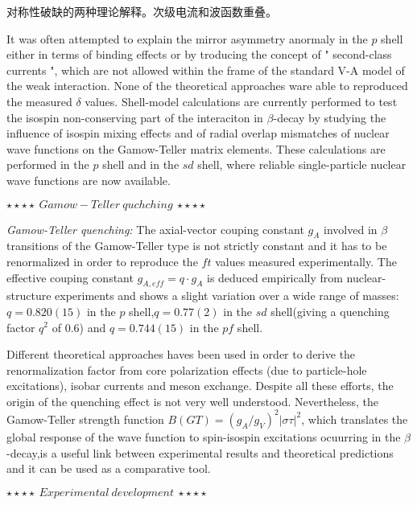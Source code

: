 \documentclass[UTF8]{ctexart}
\begin{document}
对称性破缺的两种理论解释。次级电流和波函数重叠。

It was often attempted to explain the mirror asymmetry anormaly in the $p$ shell either in terms of binding effects or by troducing the concept of " second-class currents ", which are not allowed within the frame of the standard V-A model of the weak interaction. None of the theoretical approaches ware able to reproduced the measured $\delta$ values. Shell-model calculations are currently performed to test the isospin non-conserving part of the interaciton in $\beta$-decay by studying the influence of isospin mixing effects and of radial overlap mismatches of nuclear wave functions on the Gamow-Teller matrix elements. These calculations are performed in the $p$ shell and in the $sd$ shell, where reliable single-particle nuclear wave functions are now available.


$\star\star\star\star~Gamow-Teller~quchching~\star\star\star\star$



\textit{Gamow-Teller quenching:} The axial-vector couping constant $g_{A}$ involved in $\beta$ transitions of the Gamow-Teller type is not strictly constant and it has to be renormalized in order to reproduce the $ft$ values measured experimentally. The effective couping constant $g_{A,eff}=q\cdot g_{A}$ is deduced empirically from nuclear-structure experiments and shows a slight variation over a wide range of masses: $q=0.820(15)$ in the $p$ shell,$q=0.77(2)$ in the $sd$ shell(giving a quenching factor $q^{2}$ of 0.6) and $q=0.744(15)$ in the $pf$ shell.

Different theoretical approaches haves been used in order to derive the renormalization factor from core polarization effects (due to particle-hole excitations), isobar currents and meson exchange. Despite all these efforts, the origin of the quenching effect is not very well understood. Nevertheless, the Gamow-Teller strength function $B(GT)=\left( g_{A}/g_{V} \right)^{2}\left| \sigma \tau  \right|^{2}$, which translates the global response of the wave function to spin-isospin excitations ocuurring in the $\beta$-decay,is a useful link between experimental results and theoretical predictions and it can be used as a comparative tool.

$\star\star\star\star~Experimental~development~\star\star\star\star$
\end{document}
